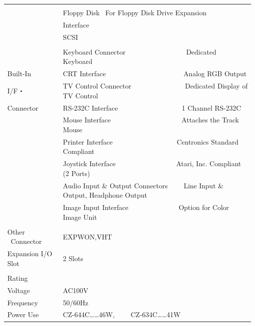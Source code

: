 \documentclass[twoside,a4paper,12pt]{article}
\begin{document}
\begin{tabular}{|p{17mm}|p{13mm}|p{23mm}|p{80mm}|p{30mm}|}
\cline{2-5}
& \multicolumn{4}{l|}{}\\[-3mm]
& \multicolumn{4}{l|}{Floppy Disk \ For Floppy Disk Drive Expansion}\\[2mm]
& \multicolumn{4}{l|}{Interface}\\[2mm]
& \multicolumn{4}{l|}{SCSI}\\[2mm]
& \multicolumn{4}{l|}{}\\
& \multicolumn{4}{l|}{Keyboard Connector \ \ \ \ \ \ \ \ \ \ \ \ \ \ \ \ \ Dedicated Keyboard}\\
Built-In & \multicolumn{4}{l|}{CRT Interface \ \ \ \ \ \ \ \ \ \ \ \ \ \ \ \ \ \ \ \ \ \ Analog RGB Output}\\
I/F・ & \multicolumn{4}{l|}{TV Control Connector \ \ \ \ \ \ \ \ \ \ \ \ \ \ \ Dedicated Display of TV Control}\\
Connector & \multicolumn{4}{l|}{RS-232C Interface \ \ \ \ \ \ \ \ \ \ \ \ \ \ \ \ \ \ 1 Channel RS-232C}\\
& \multicolumn{4}{l|}{Mouse Interface \ \ \ \ \ \ \ \ \ \ \ \ \ \ \ \ \ \ \ \ Attaches the Track Mouse}\\
& \multicolumn{4}{l|}{Printer Interface \ \ \ \ \ \ \ \ \ \ \ \ \ \ \ \ \ \ Centronics Standard Compliant}\\
& \multicolumn{4}{l|}{Joystick Interface \ \ \ \ \ \ \ \ \ \ \ \ \ \ \ \ \ Atari, Inc. Compliant (2 Ports)}\\
& \multicolumn{4}{l|}{Audio Input \& Output Connectors \ \ \ \ Line Input \& Output, Headphone Output}\\
& \multicolumn{4}{l|}{Image Input Interface \ \ \ \ \ \ \ \ \ \ \ \ \ \ Option for Color Image Unit}\\
\hline
\multicolumn{3}{|l|}{} & \multicolumn{2}{l|}{}\\[-3mm]
\multicolumn{3}{|l|}{Other \ Connector} & \multicolumn{2}{l|}{EXPWON,VHT}\\
\multicolumn{3}{|l|}{Expansion I/O Slot} & \multicolumn{2}{l|}{2 Slots}\\
\hline
& \multicolumn{4}{l|}{}\\[-3mm]
Rating & \multicolumn{4}{l|}{}\\
Voltage & \multicolumn{4}{l|}{AC100V}\\
Frequency & \multicolumn{4}{l|}{50/60Hz}\\
Power Use & \multicolumn{4}{l|}{CZ-644C……46W, \ \ \ \ CZ-634C……41W}\\[2mm]
\hline
\end{tabular}
\end{document}

